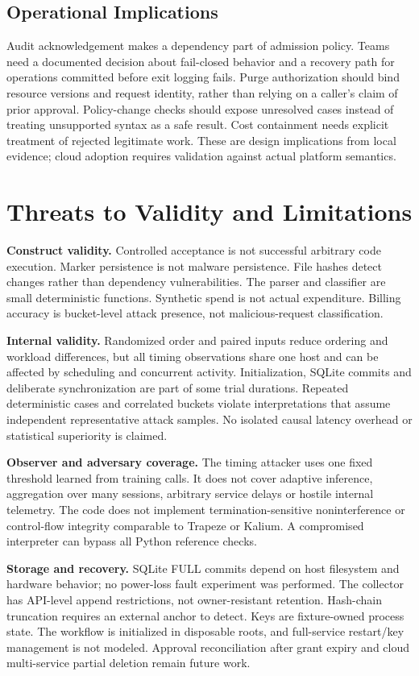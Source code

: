 \documentclass[11pt,a4paper]{article}
\begin{document}
\subsection{Operational Implications}
Audit acknowledgement makes a dependency part of admission policy. Teams need a documented decision about fail-closed behavior and a recovery path for operations committed before exit logging fails. Purge authorization should bind resource versions and request identity, rather than relying on a caller's claim of prior approval. Policy-change checks should expose unresolved cases instead of treating unsupported syntax as a safe result. Cost containment needs explicit treatment of rejected legitimate work. These are design implications from local evidence; cloud adoption requires validation against actual platform semantics.

\section{Threats to Validity and Limitations}
\textbf{Construct validity.} Controlled acceptance is not successful arbitrary code execution. Marker persistence is not malware persistence. File hashes detect changes rather than dependency vulnerabilities. The parser and classifier are small deterministic functions. Synthetic spend is not actual expenditure. Billing accuracy is bucket-level attack presence, not malicious-request classification.

\textbf{Internal validity.} Randomized order and paired inputs reduce ordering and workload differences, but all timing observations share one host and can be affected by scheduling and concurrent activity. Initialization, SQLite commits and deliberate synchronization are part of some trial durations. Repeated deterministic cases and correlated buckets violate interpretations that assume independent representative attack samples. No isolated causal latency overhead or statistical superiority is claimed.

\textbf{Observer and adversary coverage.} The timing attacker uses one fixed threshold learned from training calls. It does not cover adaptive inference, aggregation over many sessions, arbitrary service delays or hostile internal telemetry. The code does not implement termination-sensitive noninterference or control-flow integrity comparable to Trapeze or Kalium. A compromised interpreter can bypass all Python reference checks.

\textbf{Storage and recovery.} SQLite FULL commits depend on host filesystem and hardware behavior; no power-loss fault experiment was performed. The collector has API-level append restrictions, not owner-resistant retention. Hash-chain truncation requires an external anchor to detect. Keys are fixture-owned process state. The workflow is initialized in disposable roots, and full-service restart/key management is not modeled. Approval reconciliation after grant expiry and cloud multi-service partial deletion remain future work.
\end{document}
